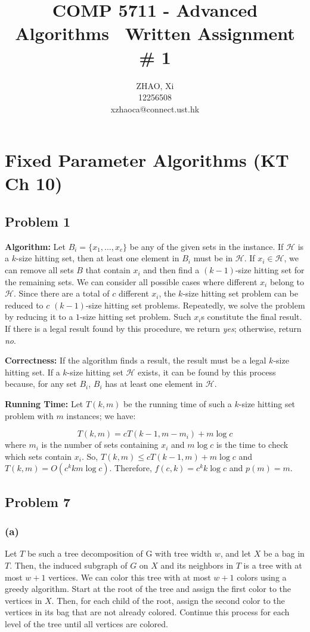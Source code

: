 \documentclass[12pt,onecolumn,a4paper]{article}
\title{\textbf{COMP 5711 - Advanced Algorithms} \ \textbf{Written Assignment \# 1}}
\author{ZHAO, Xi \\12256508 \\xzhaoca@connect.ust.hk}
\begin{document}
\maketitle

\section*{Fixed Parameter Algorithms (KT Ch 10)}
\subsection*{Problem 1}
\textbf{Algorithm:} Let $B_i = \{x_1, \dots, x_c\}$ be any of the given sets in the instance. If $\mathcal{H}$ is a $k$-size hitting set, then at least one element in $B_i$ must be in $\mathcal{H}$. If $x_i \in \mathcal{H}$, we can remove all sets $B$ that contain $x_i$ and then find a $(k-1)$-size hitting set for the remaining sets. We can consider all possible cases where different $x_i$ belong to $\mathcal{H}$. Since there are a total of $c$ different $x_i$, the $k$-size hitting set problem can be reduced to $c$ $(k-1)$-size hitting set problems. Repeatedly, we solve the problem by reducing it to a $1$-size hitting set problem. Such $x_i$s constitute the final result. If there is a legal result found by this procedure, we return \textit{yes}; otherwise, return \textit{no}.

\textbf{Correctness:} If the algorithm finds a result, the result must be a legal $k$-size hitting set. If a $k$-size hitting set $\mathcal{H}$ exists, it can be found by this process because, for any set $B_i$, $B_i$ has at least one element in $\mathcal{H}$.

\textbf{Running Time:} Let $T(k, m)$ be the running time of such a $k$-size hitting set problem with $m$ instances; we have:

\begin{equation}
	T(k, m) = cT(k-1, m-m_i) + m\log c
\end{equation}
where $m_i$ is the number of sets containing $x_i$ and $m\log c$ is the time to check which sets contain $x_i$. So, $T(k, m) \leq cT(k-1, m) + m\log c$ and $T(k, m) = O(c^k km \log c)$. Therefore, $f(c, k) = c^k k \log c$ and $p(m) = m$.

\subsection*{Problem 7}
\subsubsection*{(a)} 
Let $T$ be such a tree decomposition of G with tree width $w$, and let $X$ be a bag in $T$. Then, the induced subgraph of $G$ on $X$ and its neighbors in $T$ is a tree with at most $w + 1$ vertices.
We can color this tree with at most $w + 1$ colors using a greedy algorithm. Start at the root of the tree and assign the first color to the vertices in $X$. Then, for each child of the root, assign the second color to the vertices in its bag that are not already colored. Continue this process for each level of the tree until all vertices are colored.
\end{document}
